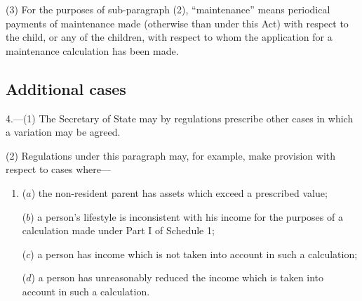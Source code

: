 \documentclass[12pt,a4paper]{article}
\begin{document}
{(3) For the purposes of sub-paragraph (2), “maintenance” means periodical payments of maintenance made (otherwise than under this Act) with respect to the child, or any of the children, with respect to whom the application for a maintenance calculation has been made.


\subsection*{Additional cases}

4.—(1) The Secretary of State may by regulations prescribe other cases in which a variation may be agreed.

(2) Regulations under this paragraph may, for example, make provision with respect to cases where---
\begin{enumerate}\item[]
($a$) the non-resident parent has assets which exceed a prescribed value;

($b$) a person’s lifestyle is inconsistent with his income for the purposes of a calculation made under Part I of Schedule 1;

($c$) a person has income which is not taken into account in such a calculation;

($d$) a person has unreasonably reduced the income which is taken into account in such a calculation.
\end{enumerate}

}
\end{document}

